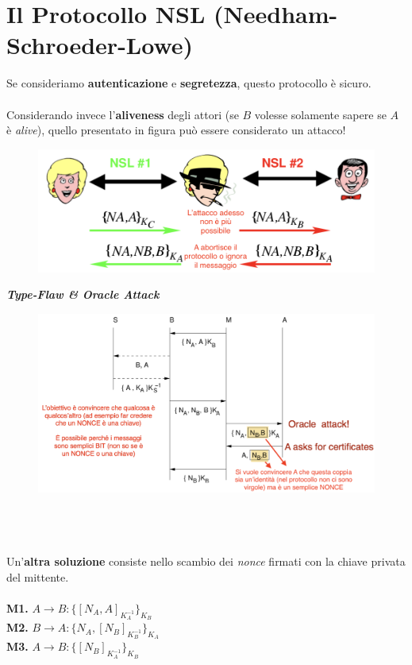 \documentclass[11pt, a4paper, twoside, italian]{report}
\theoremstyle{plain}
\begin{document}
\section*{Il Protocollo NSL (Needham-Schroeder-Lowe)}
\begin{multicols}{2}
	\noindent
	Se consideriamo \textbf{autenticazione} e \textbf{segretezza}, questo protocollo è sicuro.\\\\
	Considerando invece l'\textbf{aliveness} degli attori (se $B$ volesse solamente sapere se $A$ è \textit{alive}), quello presentato in figura può essere considerato un attacco!
\columnbreak
	\begin{figure}[H]
		\centering
		\includegraphics[scale=0.45]{nsl}
	\end{figure}
\end{multicols}

\begin{multicols}{3}
\noindent
\textbf{\textit{Type-Flaw \& Oracle Attack}}
\begin{figure}[H]
	\centering
	\includegraphics[scale=0.6]{lowetypeflaw}
\end{figure}
\columnbreak
~\\

\columnbreak
~\\\\
\noindent
Un'\textbf{altra soluzione} consiste nello scambio dei \textit{nonce} firmati con la chiave privata del mittente.\\\\
\textbf{M1.} $A \rightarrow B: \{ [N_A, A]_{K_A^{-1}} \}_{K_B}$\\
\textbf{M2.} $B \rightarrow A: \{ N_A, [N_B]_{K_B^{-1}} \}_{K_A}$\\
\textbf{M3.} $A \rightarrow B: \{ [N_B]_{K_A^{-1}} \}_{K_B}$
\end{multicols}
\end{document}
